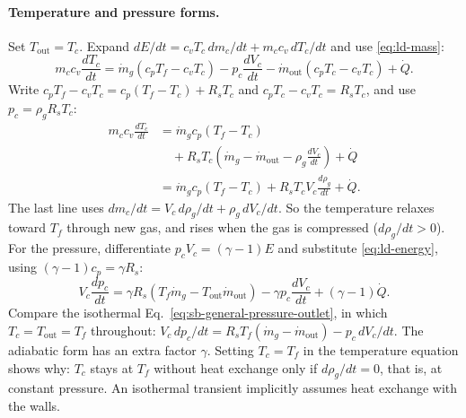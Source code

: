 \paragraph{Temperature and pressure forms.} Set
$T_{\mathrm{out}}=T_c$. Expand
$dE/dt=c_vT_c\,dm_c/dt+m_cc_v\,dT_c/dt$ and use \eqref{eq:ld-mass}:
\[
 m_cc_v\frac{dT_c}{dt}
 =\dot m_g(c_pT_f-c_vT_c)-p_c\frac{dV_c}{dt}
  -\dot m_{\mathrm{out}}(c_pT_c-c_vT_c)+\dot Q .
\]
Write $c_pT_f-c_vT_c=c_p(T_f-T_c)+R_sT_c$ and
$c_pT_c-c_vT_c=R_sT_c$, and use $p_c=\rho_gR_sT_c$:
\begin{align*}
 m_cc_v\frac{dT_c}{dt}
 &=\dot m_gc_p(T_f-T_c)\\
 &\quad+R_sT_c\left(\dot m_g-\dot m_{\mathrm{out}}
   -\rho_g\frac{dV_c}{dt}\right)+\dot Q\\
 &=\dot m_gc_p(T_f-T_c)+R_sT_cV_c\frac{d\rho_g}{dt}+\dot Q .
\end{align*}
The last line uses
$dm_c/dt=V_c\,d\rho_g/dt+\rho_g\,dV_c/dt$. So the temperature relaxes
toward $T_f$ through new gas, and rises when the gas is compressed
($d\rho_g/dt>0$). For the pressure, differentiate
$p_cV_c=(\gamma-1)E$ and substitute \eqref{eq:ld-energy}, using
$(\gamma-1)c_p=\gamma R_s$:
\begin{equation}\label{eq:ld-pressure-energy}
 V_c\frac{dp_c}{dt}
 =\gamma R_s\left(T_f\dot m_g-T_{\mathrm{out}}\dot m_{\mathrm{out}}\right)
  -\gamma p_c\frac{dV_c}{dt}+(\gamma-1)\dot Q .
\end{equation}
Compare the isothermal Eq.~\eqref{eq:sb-general-pressure-outlet}, in
which $T_c=T_{\mathrm{out}}=T_f$ throughout:
$V_c\,dp_c/dt=R_sT_f(\dot m_g-\dot m_{\mathrm{out}})-p_c\,dV_c/dt$.
The adiabatic form has an extra factor $\gamma$. Setting $T_c=T_f$ in
the temperature equation shows why: $T_c$ stays at $T_f$ without heat
exchange only if $d\rho_g/dt=0$, that is, at constant pressure. An
isothermal transient implicitly assumes heat exchange with the walls.

